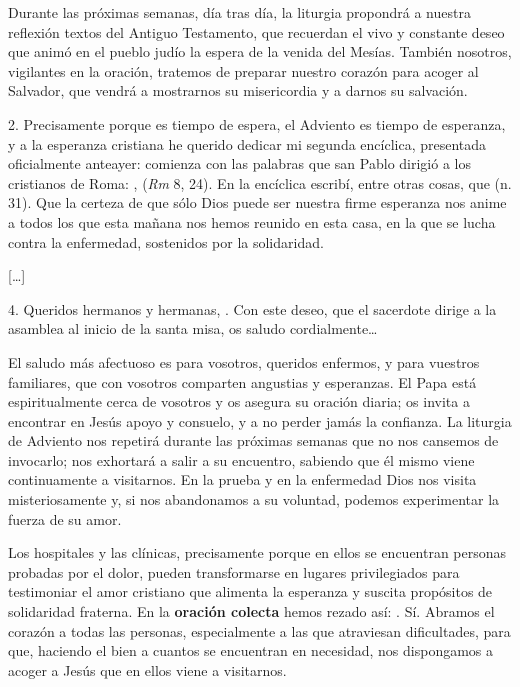 Durante las próximas semanas, día tras día, la liturgia propondrá a nuestra reflexión textos del Antiguo Testamento, que recuerdan el vivo y constante deseo que animó en el pueblo judío la espera de la venida del Mesías. También nosotros, vigilantes en la oración, tratemos de preparar nuestro corazón para acoger al Salvador, que vendrá a mostrarnos su misericordia y a darnos su salvación.

2. Precisamente porque es tiempo de espera, el Adviento es tiempo de esperanza, y a la esperanza cristiana he querido dedicar mi segunda encíclica, presentada oficialmente anteayer: comienza con las palabras que san Pablo dirigió a los cristianos de Roma: \emph{},  (\emph{Rm} 8, 24). En la encíclica escribí, entre otras cosas, que  (n. 31). Que la certeza de que sólo Dios puede ser nuestra firme esperanza nos anime a todos los que esta mañana nos hemos reunido en esta casa, en la que se lucha contra la enfermedad, sostenidos por la solidaridad.

{[}\ldots{}{]}

4. Queridos hermanos y hermanas, . Con este deseo, que el sacerdote dirige a la asamblea al inicio de la santa misa, os saludo cordialmente\ldots{}

El saludo más afectuoso es para vosotros, queridos enfermos, y para vuestros familiares, que con vosotros comparten angustias y esperanzas. El Papa está espiritualmente cerca de vosotros y os asegura su oración diaria; os invita a encontrar en Jesús apoyo y consuelo, y a no perder jamás la confianza. La liturgia de Adviento nos repetirá durante las próximas semanas que no nos cansemos de invocarlo; nos exhortará a salir a su encuentro, sabiendo que él mismo viene continuamente a visitarnos. En la prueba y en la enfermedad Dios nos visita misteriosamente y, si nos abandonamos a su voluntad, podemos experimentar la fuerza de su amor.

Los hospitales y las clínicas, precisamente porque en ellos se encuentran personas probadas por el dolor, pueden transformarse en lugares privilegiados para testimoniar el amor cristiano que alimenta la esperanza y suscita propósitos de solidaridad fraterna. En la \textbf{oración colecta} hemos rezado así: . Sí. Abramos el corazón a todas las personas, especialmente a las que atraviesan dificultades, para que, haciendo el bien a cuantos se encuentran en necesidad, nos dispongamos a acoger a Jesús que en ellos viene a visitarnos.

